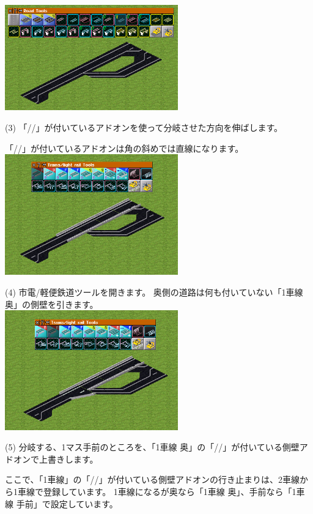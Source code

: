 \documentclass{jarticle}
\begin{document}
\begin{multicols}{2}
\includegraphics[width = 75mm]{picture/20210214-road-2-3.png}

(3)
「//」が付いているアドオンを使って分岐させた方向を伸ばします。

「//」が付いているアドオンは角の斜めでは直線になります。\\



\includegraphics[width = 75mm]{picture/20210214-road-2-4.png}

(4)
市電/軽便鉄道ツールを開きます。
奥側の道路は何も付いていない「1車線 奥」の側壁を引きます。\\


\includegraphics[width = 75mm]{picture/20210214-road-2-5.png}

(5)
分岐する、1マス手前のところを、「1車線 奥」の「//」が付いている側壁アドオンで上書きします。

ここで、「1車線」の「//」が付いている側壁アドオンの行き止まりは、2車線から1車線で登録しています。
1車線になるが奥なら「1車線 奥」、手前なら「1車線 手前」で設定しています。\\


\end{multicols}
\end{document}

